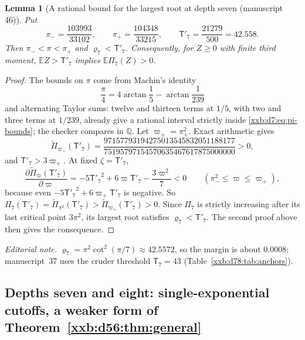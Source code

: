 \documentclass[11pt,a4paper]{article}
\numberwithin{equation}{section}
\newtheorem{lemma}[theorem]{Lemma}
\theoremstyle{definition}
\theoremstyle{remark}
\theoremstyle{plain}
\newcommand{\Q}{\mathbb Q}
\begin{document}
\begin{lemma}[A rational bound for the largest root at depth seven (manuscript 46)]\label{xxb:d7:lem:cT}
Put
\begin{equation}\label{xxb:d7:eq:pi-bounds}
 \pi_-=\frac{103993}{33102},\qquad \pi_+=\frac{104348}{33215},\qquad
 \mathsf T'_7=\frac{21279}{500}=42.558.
\end{equation}
Then $\pi_-<\pi<\pi_+$ and $\varrho_7<\mathsf T'_7$.  Consequently, for
$Z\ge0$ with finite third moment, $\mathbb EZ>\mathsf T'_7$ implies
$\mathbb E\Pi_7(Z)>0$.
\end{lemma}
\begin{proof}
The bounds on $\pi$ come from Machin's identity
\begin{equation}\label{xxb:d7:eq:machin}
 \frac\pi4=4\arctan\frac15-\arctan\frac1{239}
\end{equation}
and alternating Taylor sums: twelve and thirteen terms at $1/5$, with two and
three terms at $1/239$, already give a rational interval strictly inside
\eqref{xxb:d7:eq:pi-bounds}; the checker compares in $\Q$.  Let
$\varpi_+=\pi_+^2$.  Exact arithmetic gives
\begin{equation}\label{xxb:d7:eq:PT}
 \widetilde\Pi_{\varpi_+}(\mathsf T'_7)=
 \frac{97157793194275013545832051188177}{75195797154570635467617875000000}>0,
\end{equation}
and $\mathsf T'_7>3\varpi_+$.  At fixed $\zeta=\mathsf T'_7$,
\[
 \frac{\partial\widetilde\Pi_\varpi(\mathsf T'_7)}{\partial\varpi}
 =-5{\mathsf T'_7}^2+6\varpi\mathsf T'_7-\frac{3\varpi^2}{7}<0
 \qquad(\pi_-^2\le\varpi\le\varpi_+),
\]
because even $-5{\mathsf T'_7}^2+6\varpi_+\mathsf T'_7$ is negative.  So
$\Pi_7(\mathsf T'_7)=\widetilde\Pi_{\pi^2}(\mathsf T'_7)>\widetilde\Pi_{\varpi_+}(\mathsf T'_7)>0$.
Since $\Pi_7$ is strictly increasing after its last critical point $3\pi^2$,
its largest root satisfies $\varrho_7<\mathsf T'_7$.  The second proof
above then gives the consequence.
\end{proof}
\emph{Editorial note.}  $\varrho_7=\pi^2\cot^2(\pi/7)\approx42.5572$, so the
margin is about $0.0008$; manuscript~37 uses the cruder threshold
$\mathsf T_7=43$ (Table~\ref{xxb:d78:tab:anchors}).

\subsection{Depths seven and eight: single-exponential cutoffs, a weaker form of Theorem~\ref{xxb:d56:thm:general}}\label{xxb:d78:sec:universal}
\end{document}
